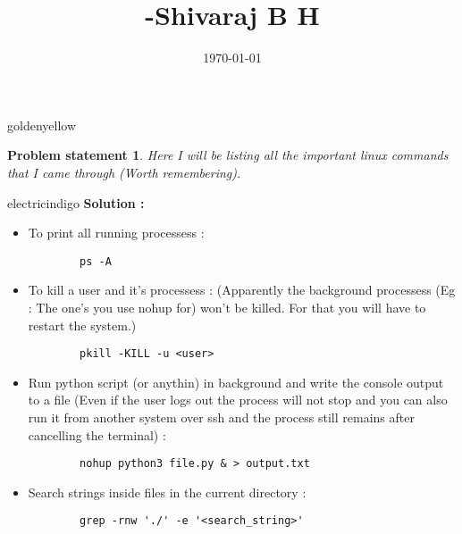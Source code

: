 \documentclass[12pt]{article}
\newtheorem*{prob*}{Problem statement}
\begin{document}
	\title{
		\fontsize{16}{24}\bfseries
	-Shivaraj B H
	}
	\date{\today}
	\maketitle



	
	\begin{mybox}{goldenyellow}{}
		\begin{prob*}		
			Here I will be listing all the important linux commands that I came through (Worth remembering).
			\end{prob*}
	\end{mybox}


\vspace{0.3cm}				
			
\begin{mybox}{electricindigo}{}
	\textbf{Solution :} 
	\begin{itemize}
		\item[\textbf{1}] To print all running processess : 
		\begin{lstlisting}
		ps -A
		\end{lstlisting}
		\item[\textbf{2}] To kill a user and it's processess :  (Apparently the background processess (Eg : The one's you use nohup for) won't be killed. For that you will have to restart the system.)
		\begin{lstlisting}
		pkill -KILL -u <user>
		\end{lstlisting}
		\item[\textbf{3}] Run python script (or anythin) in background and write the console output to a file (Even if the user logs out the process will not stop and you can also run it from another system over ssh and the process still remains after cancelling the terminal) :
		\begin{lstlisting}
		nohup python3 file.py & > output.txt
		\end{lstlisting} 
		\item[\textbf{4}] Search strings inside files in the current directory :
		\begin{lstlisting}
		grep -rnw './' -e '<search_string>'
		\end{lstlisting}
	\end{itemize}
	
	

\end{mybox}


	

		
		
\end{document}
